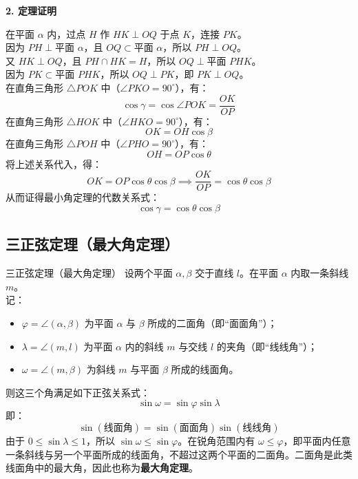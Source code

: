 \documentclass[11pt,a4paper]{ctexart}
\begin{document}
\noindent\textbf{2. 定理证明}\par
在平面 $\alpha$ 内，过点 $H$ 作 $HK \perp OQ$ 于点 $K$，连接 $PK$。\\
因为 $PH \perp \text{平面 } \alpha$，且 $OQ \subset \text{平面 } \alpha$，所以 $PH \perp OQ$。\\
又 $HK \perp OQ$，且 $PH \cap HK = H$，所以 $OQ \perp \text{平面 } PHK$。\\
因为 $PK \subset \text{平面 } PHK$，所以 $OQ \perp PK$，即 $PK \perp OQ$。\\
在直角三角形 $\triangle POK$ 中（$\angle PKO = 90^\circ$），有：
\[ \cos\gamma = \cos\angle POK = \frac{OK}{OP} \]
在直角三角形 $\triangle HOK$ 中（$\angle HKO = 90^\circ$），有：
\[ OK = OH \cos\beta \]
在直角三角形 $\triangle POH$ 中（$\angle PHO = 90^\circ$），有：
\[ OH = OP \cos\theta \]
将上述关系代入，得：
\[ OK = OP \cos\theta \cos\beta \implies \frac{OK}{OP} = \cos\theta \cos\beta \]
从而证得最小角定理的代数关系式：
\[ \cos\gamma = \cos\theta \cos\beta \]

\subsection{三正弦定理（最大角定理）}

\begin{theorembox}{三正弦定理（最大角定理）}
设两个平面 $\alpha, \beta$ 交于直线 $l$。在平面 $\alpha$ 内取一条斜线 $m$。\\
记：
\begin{itemize}
    \item $\varphi = \angle(\alpha, \beta)$ 为平面 $\alpha$ 与 $\beta$ 所成的二面角（即“面面角”）；
    \item $\lambda = \angle(m, l)$ 为平面 $\alpha$ 内的斜线 $m$ 与交线 $l$ 的夹角（即“线线角”）；
    \item $\omega = \angle(m, \beta)$ 为斜线 $m$ 与平面 $\beta$ 所成的线面角。
\end{itemize}
则这三个角满足如下正弦关系式：
\[ \sin\omega = \sin\varphi \sin\lambda \]
即：
\[ \sin(\text{线面角}) = \sin(\text{面面角}) \sin(\text{线线角}) \]
由于 $0 \le \sin\lambda \le 1$，所以 $\sin\omega \le \sin\varphi$。在锐角范围内有 $\omega \le \varphi$，即平面内任意一条斜线与另一个平面所成的线面角，不超过这两个平面的二面角。二面角是此类线面角中的最大角，因此也称为\textbf{最大角定理}。
\end{theorembox}
\end{document}
